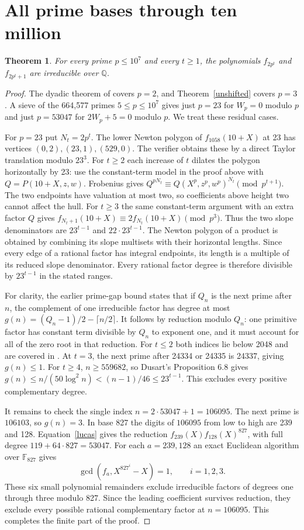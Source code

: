 \documentclass[11pt]{article}
\newtheorem{theorem}{Theorem}\newtheorem{lemma}[theorem]{Lemma}
\begin{document}
\section{All prime bases through ten million}
\begin{theorem}
For every prime $p\le10^7$ and every $t\ge1$, the polynomials $f_{2p^t}$ and $f_{2p^t+1}$ are irreducible over $\mathbb Q$.
\end{theorem}
\begin{proof}
The dyadic theorem of \cite{earlier} covers $p=2$, and Theorem~\ref{unshifted} covers $p=3$. A sieve of the 664,577 primes $5\le p\le10^7$ gives just $p=23$ for $W_p=0$ modulo $p$ and just $p=53047$ for $2W_p+5=0$ modulo $p$. We treat these residual cases.

For $p=23$ put $N_t=2p^t$. The lower Newton polygon of $f_{1058}(10+X)$ at 23 has vertices $(0,2),(23,1),(529,0)$. The verifier obtains these by a direct Taylor translation modulo $23^3$. For $t\ge2$ each increase of $t$ dilates the polygon horizontally by 23: use the constant-term model in the proof above with $Q=P(10+X,z,w)$. Frobenius gives $Q^{p N_t}\equiv Q(X^p,z^p,w^p)^{N_t}\pmod {p^{t+1}}$. The two endpoints have valuation at most two, so coefficients above height two cannot affect the hull. For $t\ge3$ the same constant-term argument with an extra factor $Q$ gives $f_{N_t+1}(10+X)\equiv2f_{N_t}(10+X)\pmod {p^3}$. Thus the two slope denominators are $23^{t-1}$ and $22\cdot23^{t-1}$. The Newton polygon of a product is obtained by combining its slope multisets with their horizontal lengths. Since every edge of a rational factor has integral endpoints, its length is a multiple of its reduced slope denominator. Every rational factor degree is therefore divisible by $23^{t-1}$ in the stated ranges.

For clarity, the earlier prime-gap bound \cite{earlier} states that if $Q_n$ is the next prime after $n$, the complement of one irreducible factor has degree at most $g(n)=(Q_n-1)/2-\lceil n/2\rceil$. It follows by reduction modulo $Q_n$: one primitive factor has constant term divisible by $Q_n$ to exponent one, and it must account for all of the zero root in that reduction. For $t\le2$ both indices lie below 2048 and are covered in \cite{earlier}. At $t=3$, the next prime after 24334 or 24335 is 24337, giving $g(n)\le1$. For $t\ge4$, $n\ge559682$, so Dusart's Proposition 6.8 \cite{dusart} gives $g(n)\le n/(50\log^2n)<(n-1)/46\le23^{t-1}$. This excludes every positive complementary degree.

It remains to check the single index $n=2\cdot53047+1=106095$. The next prime is $106103$, so $g(n)=3$. In base 827 the digits of $106095$ from low to high are 239 and 128. Equation~\eqref{lucas} gives the reduction $f_{239}(X) f_{128}(X)^{827}$, with full degree $119+64\cdot827=53047$. For each $a=239,128$ an exact Euclidean algorithm over $\mathbb F_{827}$ gives
\[
 \gcd(f_a,X^{827^i}-X)=1,\qquad i=1,2,3.
\]
These six small polynomial remainders exclude irreducible factors of degrees one through three modulo 827. Since the leading coefficient survives reduction, they exclude every possible rational complementary factor at $n=106095$. This completes the finite part of the proof.\end{proof}
\end{document}
